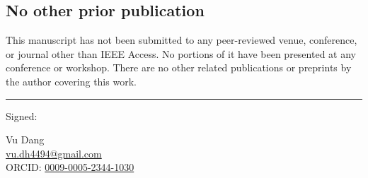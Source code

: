 \documentclass[11pt]{article}
\begin{document}
\subsection*{No other prior publication}

This manuscript has not been submitted to any peer-reviewed venue,
conference, or journal other than IEEE Access. No portions of it have
been presented at any conference or workshop. There are no other
related publications or preprints by the author covering this work.

\vspace{2em}\hrule\vspace{1em}

\noindent Signed:

\medskip

\noindent Vu Dang \\
\href{mailto:vu.dh4494@gmail.com}{vu.dh4494@gmail.com} \\
ORCID: \href{https://orcid.org/0009-0005-2344-1030}{0009-0005-2344-1030}
\end{document}
